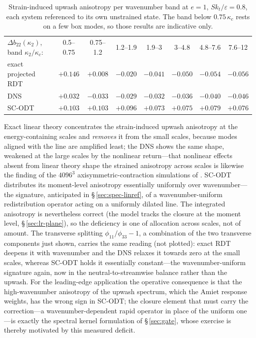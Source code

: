 \documentclass[lineno]{JFM-FLM_Au}
\begin{document}
\begin{table}
  \centering\small
  \begin{tabular}{lccccccc}
  $\Delta b_{22}(\kappa_2)$, band $\kappa_2/\kappa_c$: & 0.5--0.75 & 0.75--1.2 & 1.2--1.9 & 1.9--3 & 3--4.8 & 4.8--7.6 & 7.6--12\\[2pt]
  exact projected RDT & $+0.146$ & $+0.008$ & $-0.020$ & $-0.041$ & $-0.050$ & $-0.054$ & $-0.056$\\
  DNS                 & $+0.032$ & $-0.033$ & $-0.029$ & $-0.032$ & $-0.036$ & $-0.040$ & $-0.046$\\
  SC-ODT              & $+0.103$ & $+0.103$ & $+0.096$ & $+0.073$ & $+0.075$ & $+0.079$ & $+0.076$\\
  \end{tabular}
  \caption{Strain-induced upwash anisotropy per wavenumber band at $e=1$,
  $Sk_t/\varepsilon=0.8$, each system referenced to its own unstrained
  state. The band below $0.75\,\kappa_c$ rests on a few box modes, so those results are indicative only.}
  \label{tab:threeway}
\end{table}

Exact linear theory concentrates
the strain-induced upwash anisotropy at the energy-containing scales and
\emph{removes} it from the small scales, because modes aligned with the
line are amplified least; the DNS shows the same shape, weakened at the
large scales by the nonlinear return---that nonlinear effects absent from
linear theory shape the strained anisotropy across scales is likewise the
finding of the $4096^3$ axisymmetric-contraction simulations of
\citet{ClayYeung2016}. SC-ODT distributes
its moment-level anisotropy essentially uniformly over wavenumber---the
signature, anticipated in \S\,\ref{sec:spec-linref}, of a
wavenumber-uniform redistribution operator acting on a uniformly dilated
line. The integrated anisotropy is nevertheless correct (the model tracks
the closure at the moment level, \S\,\ref{sec:lr-plane}), so the deficiency
is one of allocation across scales, not of amount. The transverse
splitting $\phi_{11}/\phi_{33}-1$, a combination of the two transverse
components just shown, carries the same reading (not plotted): exact RDT
deepens it with wavenumber and the DNS relaxes it towards zero at the
small scales, whereas SC-ODT holds it essentially constant---the
wavenumber-uniform signature again, now in the neutral-to-streamwise
balance rather than the upwash. For the leading-edge
application the operative consequence is that the high-wavenumber
anisotropy of the upwash spectrum, which the Amiet response weights, has
the wrong sign in SC-ODT; the closure element that must carry
the correction---a wavenumber-dependent rapid operator in place of the
uniform one---is exactly the spectral kernel formulation of
\S\,\ref{sec:gate}, whose exercise is thereby motivated by this measured deficit.
\end{document}
